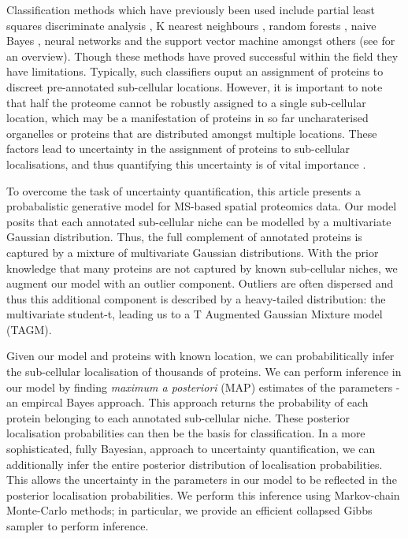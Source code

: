 \documentclass[12pt,english]{article}
\begin{document}
Classification methods which have previously been used include partial
least squares discriminate analysis \citep{Dunkley:2006}, K nearest
neighbours \citep{Groen::2014}, random forests \citep{Ohta::2010},
naive Bayes \citep{Nikolovski::2012}, neural networks
\citep{Tardif::2012} and the support vector machine amongst others
(see \cite{Gatto:2014b} for an overview). Though these methods have
proved successful within the field they have limitations. Typically,
such classifiers ouput an assignment of proteins to discreet
pre-annotated sub-cellular locations. However, it is important to note
that half the proteome cannot be robustly assigned to a single
sub-cellular location, which may be a manifestation of proteins in so
far uncharaterised organelles or proteins that are distributed amongst
multiple locations. These factors lead to uncertainty in the
assignment of proteins to sub-cellular localisations, and thus
quantifying this uncertainty is of vital importance \citep{Kirk:2015}.

To overcome the task of uncertainty quantification, this article
presents a probabalistic generative model for MS-based spatial
proteomics data. Our model posits that each annotated sub-cellular
niche can be modelled by a multivariate Gaussian distribution. Thus,
the full complement of annotated proteins is captured by a mixture of
multivariate Gaussian distributions. With the prior knowledge that
many proteins are not captured by known sub-cellular niches, we
augment our model with an outlier component. Outliers are often
dispersed and thus this additional component is described by a
heavy-tailed distribution: the multivariate student-t, leading us to a
T Augmented Gaussian Mixture model (TAGM).

Given our model and proteins with known location, we can probabilitically infer the sub-cellular localisation of thousands of proteins. We can perform inference in our model by finding \textit{maximum a posteriori} (MAP) estimates of the parameters - an empircal Bayes approach. This approach returns the probability of each protein belonging to each annotated sub-cellular niche. These posterior localisation probabilities can then be the basis for classification. In a more sophisticated, fully Bayesian, approach to uncertainty quantification, we can additionally infer the entire posterior distribution of
localisation probabilities. This allows the uncertainty in the parameters in our model to be reflected
in the posterior localisation probabilities. We perform this inference using Markov-chain Monte-Carlo methods;
in particular, we provide an efficient collapsed Gibbs sampler to perform inference.
\end{document}
